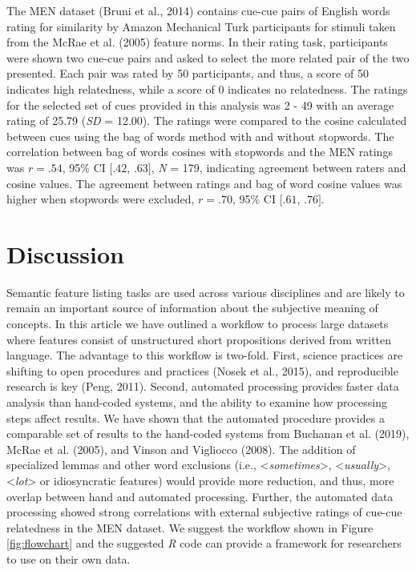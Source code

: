 \documentclass[man]{apa6}
\begin{document}
The MEN dataset (Bruni et al., 2014) contains cue-cue pairs of English words rating for similarity by Amazon Mechanical Turk participants for stimuli taken from the McRae et al. (2005) feature norms. In their rating task, participants were shown two cue-cue pairs and asked to select the more related pair of the two presented. Each pair was rated by 50 participants, and thus, a score of 50 indicates high relatedness, while a score of 0 indicates no relatedness. The ratings for the selected set of cues provided in this analysis was 2 - 49 with an average rating of 25.79 (\emph{SD} = 12.00). The ratings were compared to the cosine calculated between cues using the bag of words method with and without stopwords. The correlation between bag of words cosines with stopwords and the MEN ratings was \(r = .54\), 95\% CI \([.42\), \(.63]\), \emph{N} = 179, indicating agreement between raters and cosine values. The agreement between ratings and bag of word cosine values was higher when stopwords were excluded, \(r = .70\), 95\% CI \([.61\), \(.76]\).

\hypertarget{discussion}{%
\section{Discussion}\label{discussion}}

Semantic feature listing tasks are used across various disciplines and are likely to remain an important source of information about the subjective meaning of concepts. In this article we have outlined a workflow to process large datasets where features consist of unstructured short propositions derived from written language. The advantage to this workflow is two-fold. First, science practices are shifting to open procedures and practices (Nosek et al., 2015), and reproducible research is key (Peng, 2011). Second, automated processing provides faster data analysis than hand-coded systems, and the ability to examine how processing steps affect results. We have shown that the automated procedure provides a comparable set of results to the hand-coded systems from Buchanan et al. (2019), McRae et al. (2005), and Vinson and Vigliocco (2008). The addition of specialized lemmas and other word exclusions (i.e., \textless{}\emph{sometimes}\textgreater{}, \textless{}\emph{usually}\textgreater{}, \textless{}\emph{lot}\textgreater{} or idiosyncratic features) would provide more reduction, and thus, more overlap between hand and automated processing. Further, the automated data processing showed strong correlations with external subjective ratings of cue-cue relatedness in the MEN dataset. We suggest the workflow shown in Figure \ref{fig:flowchart} and the suggested \emph{R} code can provide a framework for researchers to use on their own data.
\end{document}
